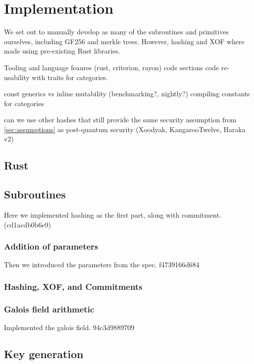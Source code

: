 \documentclass[twoside,11pt,openright]{report}
\theoremstyle{definition}
\theoremstyle{plain}
\begin{document}

\chapter{Implementation}\label{ch:impl}

We set out to manually develop as many of the subroutines and primitives ourselves, including GF256 and merkle trees. However, hashing and XOF where made using pre-existing Rust libraries.

Tooling and language feaures (rust, criterion, rayon)
code sections
code re-usability with traits for categories.

const generics vs inline mutability (benchmarking?, nightly?)
compiling constants for categories

can we use other hashes that still provide the same security assumption from \autoref{sec:assumptions} as post-quantum security (Xoodyak, KangarooTwelve, Haraka v2)


\section{Rust}
\cite{nistsaferlanguages}

\section{Subroutines}
\label{sub:subroutines}
Here we implemented hashing as the first part, along with commitment. (cd1acdb0b6e9)

\subsection{Addition of parameters}
Then we introduced the parameters from the spec. f4739166d684

\subsection{Hashing, XOF, and Commitments}

\subsection{Galois field arithmetic}
\label{}
Implemented the galois field. 94c3d9889709

\section{Key generation}
\end{document}
